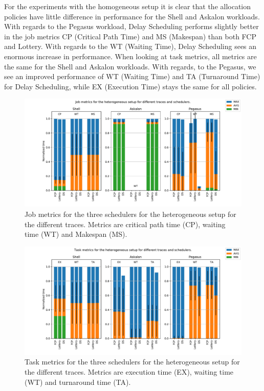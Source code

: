 \documentclass{article}
\begin{document}
For the experiments with the homogeneous setup it is clear that the allocation policies have little difference in performance for the Shell and Askalon workloads. With regards to the Pegasus workload, Delay Scheduling performs slightly better in the job metrics CP (Critical Path Time) and MS (Makespan) than both FCP and Lottery. With regards to the WT (Waiting Time), Delay Scheduling sees an enormous increase in performance. When looking at task metrics, all metrics are the same for the Shell and Askalon workloads. With regards, to the Pegasus, we see an improved performance of WT (Waiting Time) and TA (Turnaround Time) for Delay Scheduling, while EX (Execution Time) stays the same for all policies. 
\begin{figure}[H]
    \centering
    \centerline{\includegraphics[width=.8\textwidth]{setup-heterogeneous_job.pdf}}
    \caption{Job metrics for the three schedulers for the heterogeneous setup for the different traces. Metrics are critical path time (CP), waiting time (WT) and Makespan (MS).}
    \label{fig:setup-heterogeneous_job}
\end{figure}

\begin{figure}[H]
    \centering
    \centerline{\includegraphics[width=.8\textwidth]{setup-heterogeneous_task.pdf}}
    \caption{Task metrics for the three schedulers for the heterogeneous setup for the different traces. Metrics are execution time (EX), waiting time (WT) and turnaround time (TA).}
    \label{fig:setup-heterogeneous_task}
\end{figure}
\end{document}
